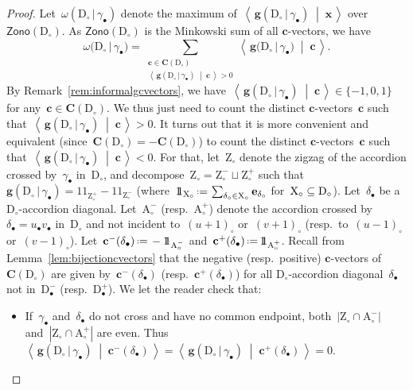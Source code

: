 \documentclass{amsart}
\theoremstyle{definition}
\newcommand{\rmX}{{\rm X}} %
\renewcommand{\b}[1]{\mathbf{#1}} %
\newcommand{\dotprod}[2]{\left\langle \, #1 \; \middle| \; #2 \, \right\rangle} %
\newcommand{\one}{{1\!\!1}} %
\newcommand{\eqdef}{\mbox{\,\raisebox{0.2ex}{\scriptsize\ensuremath{\mathrm:}}\ensuremath{=}\,}} %
\newcommand{\Zono}{\mathsf{Zono}} %
\newcommand{\dissection}{\mathrm{D}} %
\newcommand{\accordion}{\mathrm{A}} %
\newcommand{\zigzag}{\mathrm{Z}} %
\newcommand{\gvector}[2]{\mathbf{g}(#1 \,|\, #2)} %
\newcommand{\biggvector}[2]{\mathbf{g} \big( #1 \,|\, #2 \big)} %
\newcommand{\allcvectors}[1]{\mathbf{C}(#1)} %
\newcommand{\rhs}[2]{\omega(#1 \,|\, #2)} %
\newcommand{\bigrhs}[2]{\omega \big( #1  \,|\, #2 \big)} %
\newcommand{\mi}{-} %
\newcommand{\ma}{+} %
\begin{document}
\begin{proof}
Let~$\rhs{\dissection_\circ}{\gamma_\bullet}$ denote the maximum of~$\dotprod{\gvector{\dissection_\circ}{\gamma_\bullet}}{\b{x}}$ over~$\Zono(\dissection_\circ)$. As $\Zono(\dissection_\circ)$ is the Minkowski sum of all $\b{c}$-vectors, we have
\[
\bigrhs{\dissection_\circ}{\gamma_\bullet} = \sum_{\substack{\b{c} \in \allcvectors{\dissection_\circ} \\ \dotprod{\gvector{\dissection_\circ}{\gamma_\bullet}}{\b{c}} > 0}} \dotprod{\biggvector{\dissection_\circ}{\gamma_\bullet}}{\b{c}}.
\]
By Remark~\ref{rem:informalgcvectors}, we have~$\dotprod{\gvector{\dissection_\circ}{\gamma_\bullet}}{\b{c}} \in \{-1, 0, 1\}$ for any~$\b{c} \in \allcvectors{\dissection_\circ}$. We thus just need to count the distinct $\b{c}$-vectors~$\b{c}$ such that~$\dotprod{\gvector{\dissection_\circ}{\gamma_\bullet}}{\b{c}} > 0$. It turns out that it is more convenient and equivalent (since~$\allcvectors{\dissection_\circ} = -\allcvectors{\dissection_\circ}$) to count the distinct $\b{c}$-vectors~$\b{c}$ such that~$\dotprod{\gvector{\dissection_\circ}{\gamma_\bullet}}{\b{c}} < 0$. 
%
For that, let~$\zigzag_\circ$ denote the zigzag of the accordion crossed by~$\gamma_\bullet$ in~$\dissection_\circ$, and decompose~${\zigzag_\circ = \zigzag_\circ^- \sqcup \zigzag_\circ^+}$ such that~$\gvector{\dissection_\circ}{\gamma_\bullet} = \one_{\zigzag_\circ^+} - \one_{\zigzag_\circ^-}$ (where~$\one_{\rmX_\circ} \eqdef \sum_{\delta_\circ \in \rmX_\circ} \b{e}_{\delta_\circ}$ for~${\rmX_\circ \subseteq \dissection_\circ}$).
%
Let~$\delta_\bullet$ be a \mbox{$\dissection_\circ$-accordion} diagonal. Let~$\accordion_\circ^-$ (resp.~$\accordion_\circ^+$) denote the accordion crossed by~$\delta_\bullet = u_\bullet v_\bullet$ in~$\dissection_\circ$ and not incident to~$(u+1)_\circ$ or~$(v+1)_\circ$ (resp.~to~$(u-1)_\circ$ or~$(v-1)_\circ$). Let~$\b{c}^-(\delta_\bullet) \eqdef -\one_{\accordion_\circ^-}$ and~$\b{c}^+(\delta_\bullet) \eqdef \one_{\accordion_\circ^+}$. Recall from Lemma~\ref{lem:bijectioncvectors} that the negative (resp.~positive) $\b{c}$-vectors of~$\allcvectors{\dissection_\circ}$ are given by~$\b{c}^-(\delta_\bullet)$ (resp.~$\b{c}^+(\delta_\bullet)$) for all $\dissection_\circ$-accordion diagonal~$\delta_\bullet$ not in~$\dissection_\bullet^\mi$  (resp.~$\dissection_\bullet^\ma$).
%
We let the reader check that:
\begin{itemize}
\item If~$\gamma_\bullet$ and~$\delta_\bullet$ do not cross and have no common endpoint, both~$|\zigzag_\circ \cap \accordion_\circ^-|$ and~$|\zigzag_\circ \cap \accordion_\circ^+|$ are even. Thus $\dotprod{\gvector{\dissection_\circ}{\gamma_\bullet}}{\b{c}^-(\delta_\bullet)} = \dotprod{\gvector{\dissection_\circ}{\gamma_\bullet}}{\b{c}^+(\delta_\bullet)} = 0$.

\end{itemize}
\end{proof}
\end{document}
